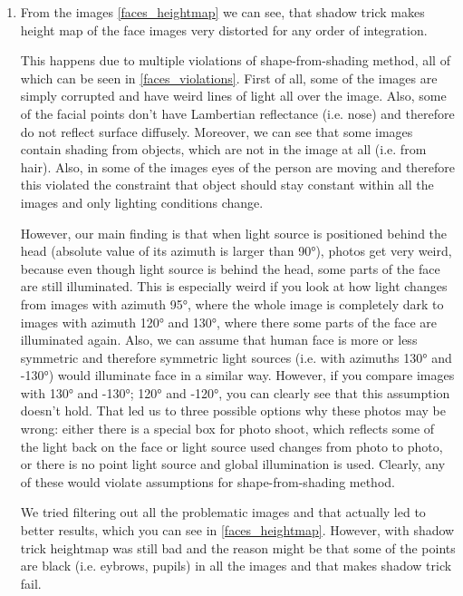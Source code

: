 \documentclass{article}
\begin{document}
\begin{enumerate}
    \item  From the images \cref{faces_heightmap} we can see, that shadow trick makes height map of the face images very distorted for any order of integration.
    
    This happens due to multiple violations of shape-from-shading method, all of which can be seen in \cref{faces_violations}. First of all, some of the images are simply corrupted and have weird lines of light all over the image. Also, some of the facial points don't have Lambertian reflectance (i.e. nose) and therefore do not reflect surface diffusely. Moreover, we can see that some images contain shading from objects, which are not in the image at all (i.e. from hair). Also, in some of the images eyes of the person are moving and therefore this violated the constraint that object should stay constant within all the images and only lighting conditions change. 
    
    However, our main finding is that when light source is positioned behind the head (absolute value of its azimuth is larger than \ang{90}), photos get very weird, because even though light source is behind the head, some parts of the face are still illuminated. This is especially weird if you look at how light changes from images with azimuth \ang{95}, where the whole image is completely dark to images with azimuth \ang{120} and \ang{130}, where there some parts of the face are illuminated again. Also, we can assume that human face is more or less symmetric and therefore symmetric light sources (i.e. with azimuths \ang{130} and -\ang{130}) would illuminate face in a similar way. However, if you compare images with \ang{130} and -\ang{130}; \ang{120} and -\ang{120}, you can clearly see that this assumption doesn't hold. That led us to three possible options why these photos may be wrong: either there is a special box for photo shoot, which reflects some of the light back on the face or light source used changes from photo to photo, or there is no point light source and global illumination is used. Clearly, any of these would violate assumptions for shape-from-shading method.
    
    We tried filtering out all the problematic images and that actually led to better results, which you can see in \cref{faces_heightmap}. However, with shadow trick heightmap was still bad and the reason might be that some of the points are black (i.e. eybrows, pupils) in all the images and that makes shadow trick fail.
    

\end{enumerate}
\end{document}
